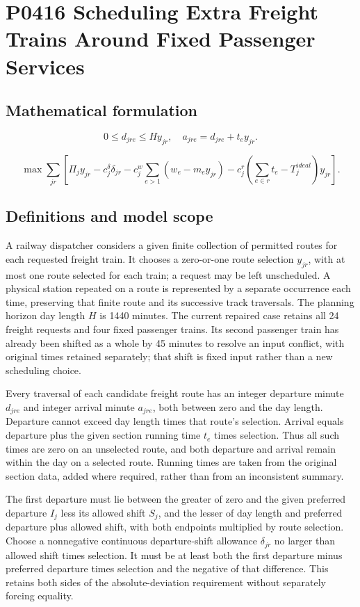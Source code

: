 \documentclass[10pt]{article}
\begin{document}
\section*{P0416 Scheduling Extra Freight Trains Around Fixed Passenger Services}
\subsection*{Mathematical formulation}
\[
0\le d_{jre}\le Hy_{jr},\quad a_{jre}=d_{jre}+t_e y_{jr}.
\]

\[
\max\sum_{jr}\left[
\Pi_jy_{jr}-c^\delta_j\delta_{jr}
-c^w_j\sum_{e>1}(w_e-m_ey_{jr})
-c^r_j(\sum_{e\in r}t_e-T_j^{ideal})y_{jr}\right].
\]

\subsection*{Definitions and model scope}
A railway dispatcher considers a given finite collection of permitted routes for each requested freight train. It chooses a zero-or-one route selection $y_{jr}$, with at most one route selected for each train; a request may be left unscheduled. A physical station repeated on a route is represented by a separate occurrence each time, preserving that finite route and its successive track traversals. The planning horizon day length $H$ is 1440 minutes. The current repaired case retains all 24 freight requests and four fixed passenger trains. Its second passenger train has already been shifted as a whole by 45 minutes to resolve an input conflict, with original times retained separately; that shift is fixed input rather than a new scheduling choice.

Every traversal of each candidate freight route has an integer departure minute $d_{jre}$ and integer arrival minute $a_{jre}$, both between zero and the day length. Departure cannot exceed day length times that route's selection. Arrival equals departure plus the given section running time $t_e$ times selection. Thus all such times are zero on an unselected route, and both departure and arrival remain within the day on a selected route. Running times are taken from the original section data, added where required, rather than from an inconsistent summary.

The first departure must lie between the greater of zero and the given preferred departure $I_j$ less its allowed shift $S_j$, and the lesser of day length and preferred departure plus allowed shift, with both endpoints multiplied by route selection. Choose a nonnegative continuous departure-shift allowance $\delta_{jr}$ no larger than allowed shift times selection. It must be at least both the first departure minus preferred departure times selection and the negative of that difference. This retains both sides of the absolute-deviation requirement without separately forcing equality.
\end{document}
